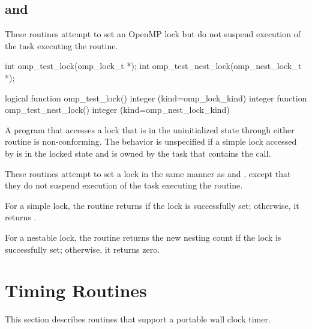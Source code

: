 \subsection{ and }
\label{subsec:omp_test_lock and omp_test_nest_lock}
\summary
These routines attempt to set an OpenMP lock but do not suspend execution of the task 
executing the routine.

\format
\ccppspecificstart
\begin{boxedcode}
int omp\_test\_lock(omp\_lock\_t *);
int omp\_test\_nest\_lock(omp\_nest\_lock\_t *);
\end{boxedcode}
\ccppspecificend

\fortranspecificstart
\begin{boxedcode}
logical function omp\_test\_lock()
integer (kind=omp\_lock\_kind) 
integer function omp\_test\_nest\_lock()
integer (kind=omp\_nest\_lock\_kind) 
\end{boxedcode}
\fortranspecificend

\constraints
A program that accesses a lock that is in the uninitialized state through either routine is 
non-conforming. The behavior is unspecified if a simple lock accessed by 
 is in the locked state and is owned by the task that contains the call.

\effect 
These routines attempt to set a lock in the same manner as  and 
, except that they do not suspend execution of the task 
executing the routine.

For a simple lock, the  routine returns  if the lock is successfully 
set; otherwise, it returns .

For a nestable lock, the  routine returns the new nesting count 
if the lock is successfully set; otherwise, it returns zero.





\vspace{-24pt}


\section{Timing Routines}
\label{sec:Timing Routines}
This section describes routines that support a portable wall clock timer.

